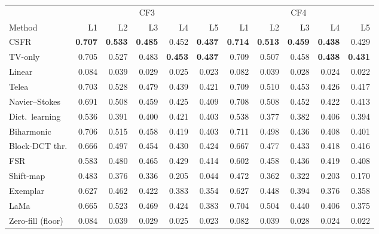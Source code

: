 \documentclass[11pt]{article}
\begin{document}
\begin{table}[htbp]
\begin{tabular}{@{}l*{10}{r}@{}}
\bottomrule
\end{tabular}
\par\medskip
\begin{tabular}{@{}l*{10}{r}@{}}
\toprule
 & \multicolumn{5}{c}{CF3} & \multicolumn{5}{c}{CF4} \\
\cmidrule(lr){2-6}\cmidrule(l){7-11}
Method & L1 & L2 & L3 & L4 & L5 & L1 & L2 & L3 & L4 & L5 \\
\midrule
CSFR & \textbf{0.707} & \textbf{0.533} & \textbf{0.485} & 0.452 & \textbf{0.437} & \textbf{0.714} & \textbf{0.513} & \textbf{0.459} & \textbf{0.438} & 0.429 \\
TV-only & 0.705 & 0.527 & 0.483 & \textbf{0.453} & \textbf{0.437} & 0.709 & 0.507 & 0.458 & \textbf{0.438} & \textbf{0.431} \\
Linear & 0.084 & 0.039 & 0.029 & 0.025 & 0.023 & 0.082 & 0.039 & 0.028 & 0.024 & 0.022 \\
Telea & 0.703 & 0.528 & 0.479 & 0.439 & 0.421 & 0.709 & 0.510 & 0.453 & 0.426 & 0.417 \\
Navier--Stokes & 0.691 & 0.508 & 0.459 & 0.425 & 0.409 & 0.708 & 0.508 & 0.452 & 0.422 & 0.413 \\
Dict.\ learning & 0.536 & 0.391 & 0.400 & 0.421 & 0.403 & 0.538 & 0.377 & 0.382 & 0.406 & 0.394 \\
Biharmonic & 0.706 & 0.515 & 0.458 & 0.419 & 0.403 & 0.711 & 0.498 & 0.436 & 0.408 & 0.401 \\
Block-DCT thr. & 0.666 & 0.497 & 0.454 & 0.430 & 0.424 & 0.667 & 0.477 & 0.433 & 0.418 & 0.416 \\
FSR & 0.583 & 0.480 & 0.465 & 0.429 & 0.414 & 0.602 & 0.458 & 0.436 & 0.419 & 0.408 \\
Shift-map & 0.483 & 0.376 & 0.336 & 0.205 & 0.044 & 0.472 & 0.362 & 0.322 & 0.203 & 0.170 \\
Exemplar & 0.627 & 0.462 & 0.422 & 0.383 & 0.354 & 0.627 & 0.448 & 0.394 & 0.376 & 0.358 \\
LaMa & 0.665 & 0.523 & 0.469 & 0.424 & 0.383 & 0.704 & 0.504 & 0.440 & 0.406 & 0.375 \\
\midrule
Zero-fill (floor) & 0.084 & 0.039 & 0.029 & 0.025 & 0.023 & 0.082 & 0.039 & 0.028 & 0.024 & 0.022 \\
\bottomrule
\end{tabular}
\end{table}
\end{document}
